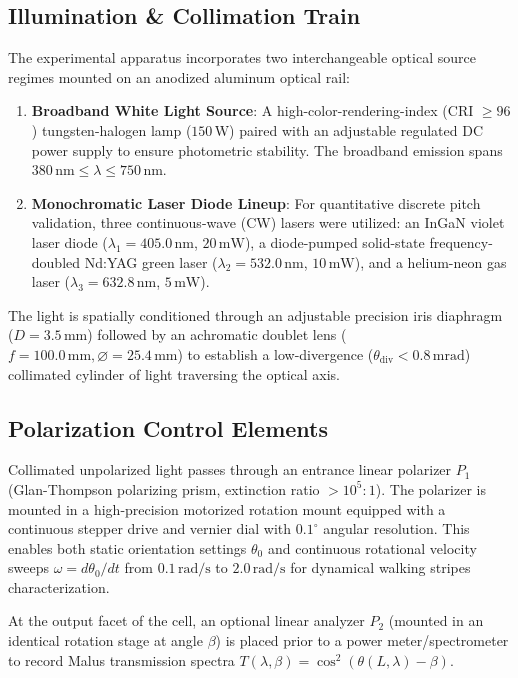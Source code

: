 \documentclass[twocolumn,10pt,a4paper]{article}
\begin{document}
\subsection{Illumination \& Collimation Train}
The experimental apparatus incorporates two interchangeable optical source regimes mounted on an anodized aluminum optical rail:
\begin{enumerate}[leftmargin=*]
  \item \textbf{Broadband White Light Source}: A high-color-rendering-index (CRI $\ge 96$) tungsten-halogen lamp ($150\,\text{W}$) paired with an adjustable regulated DC power supply to ensure photometric stability. The broadband emission spans $380\,\text{nm} \le \lambda \le 750\,\text{nm}$.
  \item \textbf{Monochromatic Laser Diode Lineup}: For quantitative discrete pitch validation, three continuous-wave (CW) lasers were utilized: an InGaN violet laser diode ($\lambda_1 = 405.0\,\text{nm}$, $20\,\text{mW}$), a diode-pumped solid-state frequency-doubled Nd:YAG green laser ($\lambda_2 = 532.0\,\text{nm}$, $10\,\text{mW}$), and a helium-neon gas laser ($\lambda_3 = 632.8\,\text{nm}$, $5\,\text{mW}$).
\end{enumerate}
The light is spatially conditioned through an adjustable precision iris diaphragm ($D = 3.5\,\text{mm}$) followed by an achromatic doublet lens ($f = 100.0\,\text{mm}, \varnothing = 25.4\,\text{mm}$) to establish a low-divergence ($\theta_{\text{div}} < 0.8\,\text{mrad}$) collimated cylinder of light traversing the optical axis.

\subsection{Polarization Control Elements}
Collimated unpolarized light passes through an entrance linear polarizer $P_1$ (Glan-Thompson polarizing prism, extinction ratio $> 10^5:1$). The polarizer is mounted in a high-precision motorized rotation mount equipped with a continuous stepper drive and vernier dial with $0.1^\circ$ angular resolution. This enables both static orientation settings $\theta_0$ and continuous rotational velocity sweeps $\omega = d\theta_0/dt$ from $0.1\,\text{rad/s}$ to $2.0\,\text{rad/s}$ for dynamical walking stripes characterization.

At the output facet of the cell, an optional linear analyzer $P_2$ (mounted in an identical rotation stage at angle $\beta$) is placed prior to a power meter/spectrometer to record Malus transmission spectra $T(\lambda, \beta) = \cos^2(\theta(L, \lambda) - \beta)$.
\end{document}
